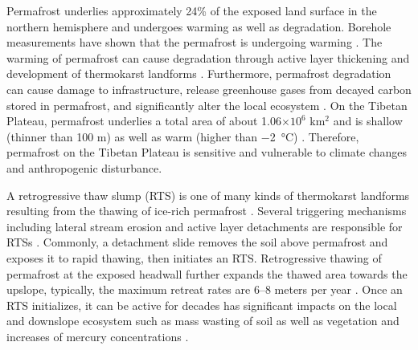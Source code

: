 \documentclass[authoryear,preprint,review,12pt]{elsarticle}
\begin{document}
Permafrost underlies approximately 24\% of the exposed land surface in the northern hemisphere \citep{zhang_statistics_1999} and undergoes warming as well as degradation. Borehole measurements have shown that the permafrost is undergoing warming  \citep{marchenko_permafrost_2007,osterkamp2005recent,romanovsky_thermal_2010,romanovsky_permafrost_2010,wu2008Recent,zhao_thermal_2010,biskaborn2019permafrost}. The warming of permafrost can cause degradation through active layer thickening and development of thermokarst landforms  \citep{zhao_thermal_2010,aakerman2008thawing,czudek_thermokarst_1970,jorgenson_response_2005,osterkamp_characteristics_2007}. Furthermore, permafrost degradation can cause damage to infrastructure, release greenhouse gases from decayed carbon stored in permafrost, and significantly alter the local ecosystem \citep{tong_effect_1996,grosse_vulnerability_2011,olefeldt_circumpolar_2016,schuur_climate_2015,schuster2018permafrost}. On the Tibetan Plateau, permafrost underlies a total area of about 1.06$\times10^6$ km$^2$ and is shallow (thinner than 100 m) as well as warm (higher than \SI{-2}{\celsius}) \citep{zhou_geocryology_2000}. Therefore, permafrost on the Tibetan Plateau is sensitive and vulnerable to climate changes and anthropogenic disturbance. %

A retrogressive thaw slump (RTS) is one of many kinds of thermokarst landforms resulting from the thawing of ice-rich permafrost \citep{czudek_thermokarst_1970, jorgenson_response_2005, jorgenson_thermokarst_2013,kokelj2013advances,farquharson2016spatial,jones2019rapid}. Several triggering mechanisms including lateral stream erosion and active layer detachments are responsible for RTSs \citep{french2017periglacial}. Commonly, a detachment slide removes the soil above permafrost and exposes it to rapid thawing, then initiates an RTS. Retrogressive thawing of permafrost at the exposed headwall further expands the thawed area towards the upslope, typically, the maximum retreat rates are 6--8 meters per year \citep{jorgenson_thermokarst_2013}. Once an RTS initializes, it can be active for decades \citep{burn1989geomorphology, lacelle2010climatic, swanson2018growth,lewkowicz2019extremes} has significant impacts on the local and downslope ecosystem such as mass wasting of soil as well as vegetation \citep{gooseff2009effects} and increases of mercury concentrations \citep{pierre2018unprecedented}. 
\end{document}
